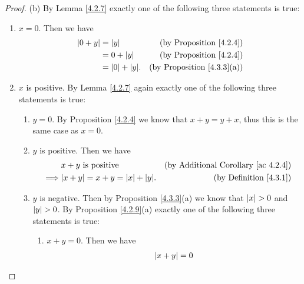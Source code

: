 \begin{proof}{(b)}
    By Lemma \ref{4.2.7} exactly one of the following three statements is true:
    \begin{enumerate}[label=(\Roman*)]
        \item \(x = 0\).
              Then we have
              \begin{align*}
                  \abs*{0 + y} & = \abs*{y}             & \text{(by Proposition \ref{4.2.4})}    \\
                               & = 0 + \abs*{y}         & \text{(by Proposition \ref{4.2.4})}    \\
                               & = \abs*{0} + \abs*{y}. & \text{(by Proposition \ref{4.3.3}(a))}
              \end{align*}
        \item \(x\) is positive.
              By Lemma \ref{4.2.7} again exactly one of the following three statements is true:
              \begin{enumerate}[label=(\roman*)]
                  \item \(y = 0\).
                        By Proposition \ref{4.2.4} we know that \(x + y = y + x\), thus this is the same case as \(x = 0\).
                  \item \(y\) is positive.
                        Then we have
                        \begin{align*}
                                     & x + y \text{ is positive}                   & \text{(by Additional Corollary \ref{ac 4.2.4})} \\
                            \implies & \abs*{x + y} = x + y = \abs*{x} + \abs*{y}. & \text{(by Definition \ref{4.3.1})}
                        \end{align*}
                  \item \(y\) is negative.
                        Then by Proposition \ref{4.3.3}(a) we know that \(\abs*{x} > 0\) and \(\abs*{y} > 0\).
                        By Proposition \ref{4.2.9}(a) exactly one of the following three statements is true:
                        \begin{enumerate}[label=(\arabic*)]
                            \item \(x + y = 0\).
                                  Then we have
                                  \begin{align*}
                                      \abs*{x + y} & = 0                                                             \\

\end{align*}
\end{enumerate}
\end{enumerate}
\end{enumerate}
\end{proof}
